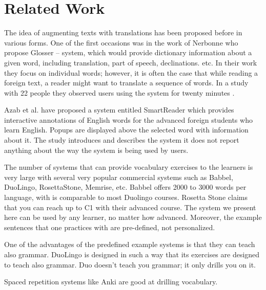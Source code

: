 
\section{Related Work}

The idea of augmenting texts with translations has been proposed before in various forms. One of the first occasions was in the work of Nerbonne \cite{Nerb99-Assistant} who propose Glosser -- system, which would provide dictionary information about a given word, including translation, part of speech, declinations. etc. In their work they focus on individual words; however, it is often the case that while reading a foreign text, a reader might want to translate a sequence of words. In a study with 22 people they observed users using the system for twenty minutes \cite{Dokter98-UserStudy}.

Azab et al. \cite{Azab13-nlp} have proposed a system entitled SmartReader which provides interactive annotations of English words for the advanced foreign students who learn English. Popups are displayed above the selected word with information about it. The study introduces and describes the system it does not report anything about the way the system is being used by users.

The number of systems that can provide vocabulary exercises to the learners is very large with several very popular commercial systems such as Babbel, DuoLingo, RosettaStone, Memrise, etc. Babbel offers 2000 to 3000 words per language, with is comparable to most Duolingo courses. Rosetta Stone claims that you can reach up to C1 with their advanced course. The system we present here can be used by any learner, no matter how advanced. Moreover, the example sentences that one practices with are pre-defined, not personalized.

One of the advantages of the predefined example systems is that they can teach also grammar. DuoLingo is designed in such a way that its exercises are designed to teach also grammar. Duo doesn't teach you grammar; it only drills you on it. 

Spaced repetition systems like Anki are good at drilling vocabulary.



